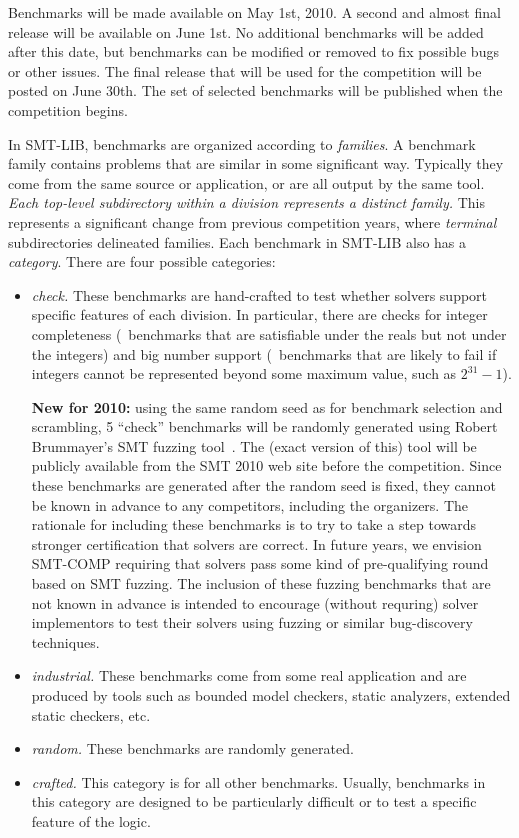 \documentclass[12pt]{article}
\begin{document}
Benchmarks will be made available on May 1st, 2010. A second and
almost final release will be available on June 1st. No additional
benchmarks will be added after this date, but benchmarks can be
modified or removed to fix possible bugs or other issues. The final
release that will be used for the competition will be posted on June
30th. The set of selected benchmarks will be published when the
competition begins.

In SMT-LIB, benchmarks are organized according to \emph{families}.  A benchmark
family contains problems that are similar in some significant way.  Typically
they come from the same source or application, or are all output by the same
tool.  \emph{Each top-level subdirectory within a division represents a distinct
family.}  This represents a significant change from previous
competition years, where \emph{terminal} subdirectories delineated families.
%
Each benchmark in SMT-LIB also has a \emph{category}.  There are four possible
categories:
%
\begin{itemize}
\item \emph{check.} These benchmarks are hand-crafted to test whether
  solvers support specific features of each division.  In particular,
  there are checks for integer completeness (\ie\ benchmarks that are
  satisfiable under the reals but not under the integers) and big
  number support (\ie\ benchmarks that are likely to fail if integers
  cannot be represented beyond some maximum value, such as
  $2^{31}-1$).

  \noindent\textbf{New for 2010:} using the same random seed as
  for benchmark selection and scrambling, 5 ``check'' benchmarks will
  be randomly generated using Robert Brummayer's SMT fuzzing
  tool~\cite{brummayer+09}.  The (exact version of this) tool will be
  publicly available from the SMT 2010 web site before the
  competition.  Since these benchmarks are generated after the random
  seed is fixed, they cannot be known in advance to any competitors,
  including the organizers.  The rationale for including these
  benchmarks is to try to take a step towards stronger certification
  that solvers are correct.  In future years, we envision SMT-COMP
  requiring that solvers pass some kind of pre-qualifying round based
  on SMT fuzzing.  The inclusion of these fuzzing benchmarks that are
  not known in advance is intended to encourage (without requring)
  solver implementors to test their solvers using fuzzing or similar
  bug-discovery techniques.
\item \emph{industrial.} These benchmarks come from some real application and are produced by tools such as bounded model checkers, static analyzers, extended static checkers, etc.
\item \emph{random.} These benchmarks are randomly generated.
\item \emph{crafted.} This category is for all other benchmarks.  Usually,
  benchmarks in this category are designed to be particularly difficult or to
  test a specific feature of the logic.
\end{itemize}
\end{document}
